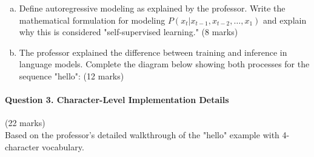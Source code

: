 \documentclass[12pt]{article}
\newcommand{\shortanswer}{\vspace{2cm}}
\newcommand{\mediumanswer}{\vspace{3cm}}
\begin{document}
\begin{enumerate}[(a)]
    \item Define autoregressive modeling as explained by the professor. Write the mathematical formulation for modeling $P(x_t | x_{t-1}, x_{t-2}, \ldots, x_1)$ and explain why this is considered "self-supervised learning." \hfill (8 marks)
    
    \mediumanswer
    
    \item The professor explained the difference between training and inference in language models. Complete the diagram below showing both processes for the sequence "hello": \hfill (12 marks)
    
    \begin{center}
    \end{center}
    
    \shortanswer
\end{enumerate}

\newpage
\paragraph{Question 3. Character-Level Implementation Details}\hfill (22 marks)\\
Based on the professor's detailed walkthrough of the "hello" example with 4-character vocabulary.
\end{document}

